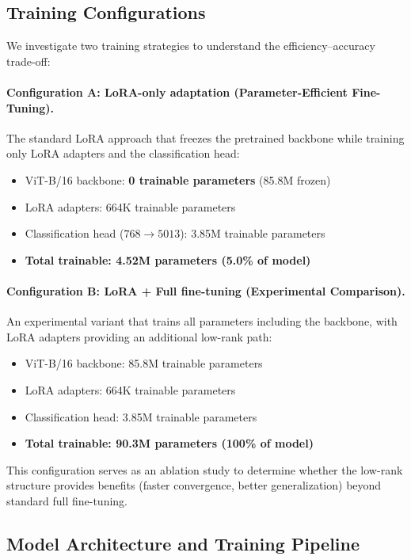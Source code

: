 \documentclass[11pt]{article}
\begin{document}
\subsection{Training Configurations}

We investigate two training strategies to understand the efficiency--accuracy trade-off:

\paragraph{Configuration A: LoRA-only adaptation (Parameter-Efficient Fine-Tuning).}
The standard LoRA approach that freezes the pretrained backbone while training only LoRA adapters and the classification head:
\begin{itemize}
    \item ViT-B/16 backbone: \textbf{0 trainable parameters} (85.8M frozen)
    \item LoRA adapters: 664K trainable parameters
    \item Classification head ($768 \to 5013$): 3.85M trainable parameters
    \item \textbf{Total trainable: 4.52M parameters (5.0\% of model)}
\end{itemize}

\paragraph{Configuration B: LoRA + Full fine-tuning (Experimental Comparison).}
An experimental variant that trains all parameters including the backbone, with LoRA adapters providing an additional low-rank path:
\begin{itemize}
    \item ViT-B/16 backbone: 85.8M trainable parameters
    \item LoRA adapters: 664K trainable parameters
    \item Classification head: 3.85M trainable parameters
    \item \textbf{Total trainable: 90.3M parameters (100\% of model)}
\end{itemize}

This configuration serves as an ablation study to determine whether the low-rank structure provides benefits (faster convergence, better generalization) beyond standard full fine-tuning.

\subsection{Model Architecture and Training Pipeline}
\end{document}
